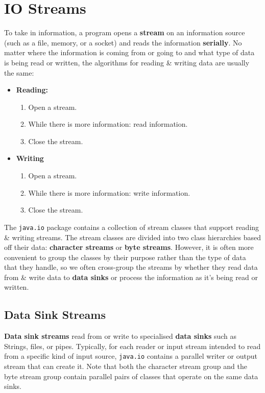 \documentclass[a4paper,11pt]{article}
\begin{document}
\section{IO Streams}
To take in information, a program opens a \textbf{stream} on an information source (such as a file, memory, or a 
socket) and reads the information \textbf{serially}.
No matter where the information is coming from or going to and what type of data is being read or written, the
algorithms for reading \& writing data are usually the same:
\begin{itemize}
    \item   \textbf{Reading:}
            \begin{enumerate}
                \item   Open a stream.
                \item   While there is more information: read information.
                \item   Close the stream.
            \end{enumerate}
    \item   \textbf{Writing}
            \begin{enumerate}
                \item   Open a stream.
                \item   While there is more information: write information.
                \item   Close the stream.
            \end{enumerate}
\end{itemize}
 
The \verb|java.io| package contains a collection of stream classes that support reading \& writing streams.
The stream classes are divided into two class hierarchies based off their data: \textbf{character streams} or 
\textbf{byte streams}.
However, it is often more convenient to group the classes by their purpose rather than the type of data that they
handle, so we often cross-group the streams by whether they read data from \& write data to \textbf{data sinks} or 
process the information as it's being read or written.

\subsection{Data Sink Streams}
\textbf{Data sink streams} read from or write to specialised \textbf{data sinks} such as Strings, files, or pipes.
Typically, for each reader or input stream intended to read from a specific kind of input source, \verb|java.io| 
contains a parallel writer or output stream that can create it.
Note that both the character stream group and the byte stream group contain parallel pairs of classes that 
operate on the same data sinks.
\end{document}
